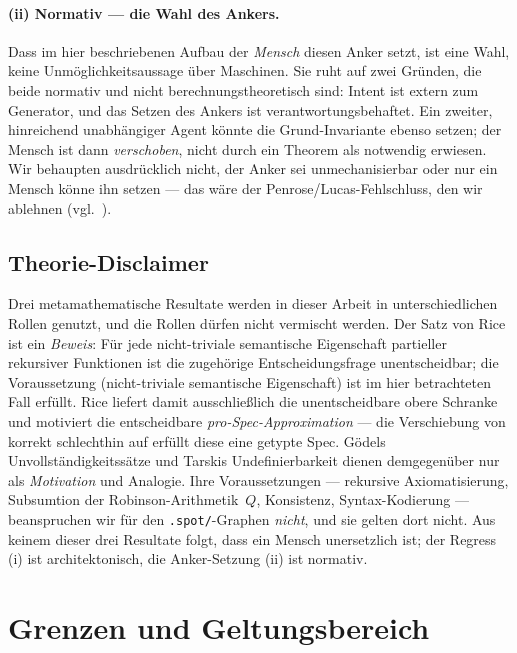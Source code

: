 \documentclass[11pt,a4paper]{article}
\theoremstyle{definition}
\theoremstyle{remark}
\begin{document}
\paragraph{(ii) Normativ --- die Wahl des Ankers.}
Dass im hier beschriebenen Aufbau der \emph{Mensch} diesen Anker setzt, ist eine
Wahl, keine Unmöglichkeitsaussage über Maschinen. Sie ruht auf zwei Gründen, die
beide normativ und nicht berechnungstheoretisch sind: Intent ist extern zum
Generator, und das Setzen des Ankers ist verantwortungsbehaftet. Ein zweiter,
hinreichend unabhängiger Agent könnte die Grund-Invariante ebenso setzen; der
Mensch ist dann \emph{verschoben}, nicht durch ein Theorem als notwendig
erwiesen. Wir behaupten ausdrücklich nicht, der Anker sei
\glqq unmechanisierbar\grqq{} oder \glqq nur ein Mensch\grqq{} könne ihn setzen ---
das wäre der Penrose/Lucas-Fehlschluss, den wir ablehnen
(vgl.\ ).

\subsection{Theorie-Disclaimer}
\label{sec:reflexiv-theorie}
Drei metamathematische Resultate werden in dieser Arbeit in unterschiedlichen
Rollen genutzt, und die Rollen dürfen nicht vermischt werden. Der Satz von Rice
\cite{rice1953} ist ein \emph{Beweis}: Für jede nicht-triviale semantische
Eigenschaft partieller rekursiver Funktionen ist die zugehörige
Entscheidungsfrage unentscheidbar; die Voraussetzung (nicht-triviale semantische
Eigenschaft) ist im hier betrachteten Fall erfüllt. Rice liefert damit
ausschließlich die unentscheidbare obere Schranke und motiviert die
entscheidbare \emph{pro-Spec-Approximation} --- die Verschiebung von
\glqq korrekt schlechthin\grqq{} auf \glqq erfüllt diese eine getypte Spec\grqq.
Gödels Unvollständigkeitssätze und Tarskis Undefinierbarkeit dienen demgegenüber
nur als \emph{Motivation} und Analogie. Ihre Voraussetzungen --- rekursive
Axiomatisierung, Subsumtion der Robinson-Arithmetik~$Q$, Konsistenz,
Syntax-Kodierung --- beanspruchen wir für den \texttt{.spot/}-Graphen
\emph{nicht}, und sie gelten dort nicht. Aus keinem dieser drei Resultate folgt,
dass ein Mensch unersetzlich ist; der Regress (i) ist architektonisch, die
Anker-Setzung (ii) ist normativ.

\section{Grenzen und Geltungsbereich}
\label{sec:grenzen}
\end{document}
